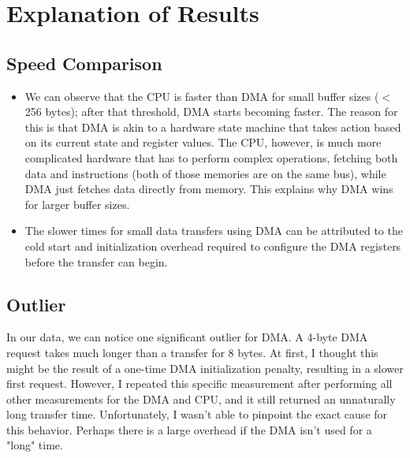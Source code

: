 \documentclass{article}
\begin{document}
\section{Explanation of Results}

\subsection{Speed Comparison}
\begin{itemize}
    \item We can observe that the CPU is faster than DMA for small buffer sizes ($<$ 256 bytes); after that threshold, DMA starts becoming faster. The reason for this is that DMA is akin to a hardware state machine that takes action based on its current state and register values. The CPU, however, is much more complicated hardware that has to perform complex operations, fetching both data and instructions (both of those memories are on the same bus), while DMA just fetches data directly from memory. This explains why DMA wins for larger buffer sizes. 
    \item The slower times for small data transfers using DMA can be attributed to the cold start and initialization overhead required to configure the DMA registers before the transfer can begin.
\end{itemize}

\subsection{Outlier}
In our data, we can notice one significant outlier for DMA. A 4-byte DMA request takes much longer than a transfer for 8 bytes. At first, I thought this might be the result of a one-time DMA initialization penalty, resulting in a slower first request. However, I repeated this specific measurement after performing all other measurements for the DMA and CPU, and it still returned an unnaturally long transfer time. Unfortunately, I wasn't able to pinpoint the exact cause for this behavior. Perhaps there is a large overhead if the DMA isn't used for a "long" time.
\end{document}
